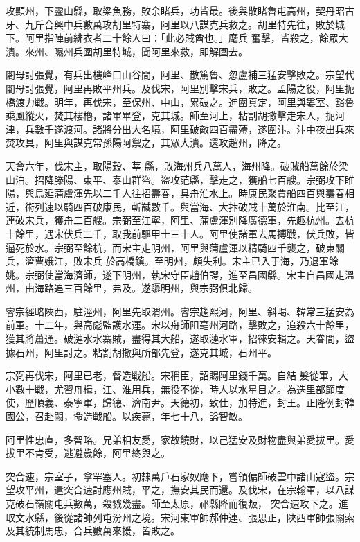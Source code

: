 \begin{pinyinscope}
 攻顯州，下靈山縣，取梁魚務，敗余睹兵，功皆最。後與散睹魯屯高州，契丹昭古牙、九斤合興中兵數萬攻胡里特寨，阿里以八謀克兵救之。胡里特先往，敗於城下。阿里指陣前緋衣者二十餘人曰：「此必賊酋也。」麾兵
 奮擊，皆殺之，餘眾大潰。來州、隰州兵圍胡里特城，聞阿里來救，即解圍去。



 闍母討張覺，有兵出樓峰口山谷間，阿里、散篤魯、忽盧補三猛安擊敗之。宗望代闍母討張覺，阿里再敗平州兵。及伐宋，阿里別擊宋兵，敗之。孟陽之役，阿里扼橋渡力戰。明年，再伐宋，至保州、中山，累破之。進圍真定，阿里與婁室、豁魯乘風縱火，焚其樓櫓，諸軍畢登，克其城。師至河上，粘割胡撒擊走宋人，扼河津，兵數千遂渡河。諸將分出大名境，阿里破敵四百盡殪，遂圍汴。汴中夜出兵來焚攻具，阿里與謀克常孫陽阿禦之，其眾大潰。還攻趙州，降之。



 天會六年，伐宋主，取陽穀、莘
 縣，敗海州兵八萬人，海州降。破賊船萬餘於梁山泊。招降滕陽、東平、泰山群盜。盜攻范縣，擊走之，獲船七百艘。宗弼攻下睢陽，與烏延蒲盧渾先以二千人往招壽春，具舟淮水上。時康民聚賈船四百與壽春相近，術列速以騎四百破康民，斬馘數千。與當海、大抃破賊十萬於淮南。比至江，連破宋兵，獲舟二百艘。宗弼至江寧，阿里、蒲盧渾別降廣德軍，先趣杭州。去杭十餘里，遇宋伏兵二千，取我前驅甲士三十人。阿里使諸軍去馬搏戰，伏兵敗，皆逼死於水。宗弼至餘杭，而宋主走明州，阿里與蒲盧渾以精騎四千襲之，破東關兵，濟曹娥江，敗宋兵
 於高橋鎮。至明州，頗失利。宋主已入于海，乃退軍餘姚。宗弼使當海濟師，遂下明州，執宋守臣趙伯諤，進至昌國縣。宋主自昌國走溫州，由海路追三百餘里，弗及。遂隳明州，與宗弼俱北歸。



 睿宗經略陜西，駐涇州，阿里先取渭州。睿宗趨熙河，阿里、斜喝、韓常三猛安為前軍。十二年，與高彪監護水運。宋以舟師阻亳州河路，擊敗之，追殺六十餘里，獲其將蕭通。破漣水水寨賊，盡得其大船，遂取漣水軍，招徠安輯之。天眷間，盜據石州，阿里討之。粘割胡撒與所部先登，遂克其城，石州平。



 宗弼再伐宋，阿里已老，督造戰船。宋稱臣，詔賜阿里錢千萬。自結
 髮從軍，大小數十戰，尤習舟楫，江、淮用兵，無役不從，時人以水星目之。為迭里部節度使，歷順義、泰寧軍，歸德、濟南尹。天德初，致仕，加特進，封王。正隆例封韓國公，召赴闕，命造戰船。以疾薨，年七十八，謚智敏。



 阿里性忠直，多智略。兄弟相友愛，家故饒財，以己猛安及財物盡與弟愛拔里。愛拔里不肯受，逃避歲餘，阿里終與之。



 突合速，宗室子，拿罕塞人。初隸萬戶石家奴麾下，嘗領偏師破雲中諸山寇盜。宗望攻平州，遣突合速討應州賊，平之，撫安其民而還。及伐宋，在宗翰軍，以八謀克破石嶺關屯兵數萬，殺戮幾盡。師至太原，祁縣降而復叛，
 突合速攻下之。進取文水縣，後從諸帥列屯汾州之境。宋河東軍帥郝仲連、張思正，陜西軍帥張關索及其統制馬忠，合兵數萬來援，皆敗之。




\end{pinyinscope}
